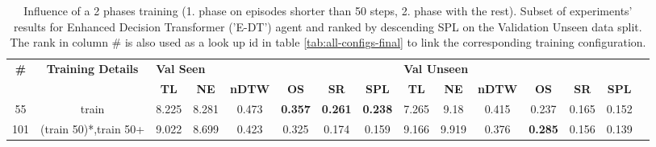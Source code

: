 \begin{table}
\centering
\caption{\label{tab:e_dt_split_training_50}Influence of a 2 phases training (1. phase on episodes shorter than 50 steps, 2. phase with the rest). Subset of experiments' results for Enhanced Decision Transformer ('E-DT') agent and ranked by descending SPL on the Validation Unseen data split. The rank in column \# is also used as a look up id in table \ref{tab:all-configs-final} to link the corresponding training configuration.}
\begin{tabular}{@{\hskip3pt}c@{\hskip3pt}c@{\hskip3pt}c@{\hskip3pt}c@{\hskip3pt}c@{\hskip3pt}c@{\hskip3pt}c@{\hskip3pt}c@{\hskip3pt}c@{\hskip3pt}c@{\hskip3pt}c@{\hskip3pt}c@{\hskip3pt}c@{\hskip3pt}c@{\hskip3pt}c}
\toprule
\textbf{\#} & \textbf{Training Details} & \multicolumn{6}{l}{\textbf{Val Seen}} & \multicolumn{6}{l}{\textbf{Val Unseen}} \\
 \textbf{~} &                \textbf{~} &       \textbf{TL} & \textbf{NE} & \textbf{nDTW} &     \textbf{OS} &     \textbf{SR} &    \textbf{SPL} &         \textbf{TL} & \textbf{NE} & \textbf{nDTW} &     \textbf{OS} & \textbf{SR} & \textbf{SPL} \\
\midrule
         55 &                     train &             8.225 &       8.281 &         0.473 &  \textbf{0.357} &  \textbf{0.261} &  \textbf{0.238} &               7.265 &        9.18 &         0.415 &           0.237 &       0.165 &        0.152 \\
        101 &     (train 50)*,train 50+ &             9.022 &       8.699 &         0.423 &           0.325 &           0.174 &           0.159 &               9.166 &       9.919 &         0.376 &  \textbf{0.285} &       0.156 &        0.139 \\
\bottomrule
\end{tabular}
\end{table}
